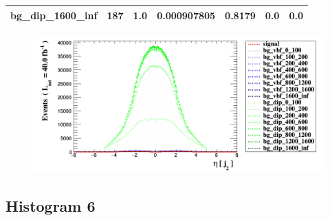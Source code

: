 \documentclass[a4paper, 10pt]{article}
\begin{document}
\begin{table}[H]
\begin{center}
\begin{tabular}{|m{23.0mm}|m{23.0mm}|m{18.0mm}|m{19.0mm}|m{19.0mm}|m{19.0mm}|m{19.0mm}|}
      \hline
      {\cellcolor{white}         bg\_dip\_1600\_inf}& {\cellcolor{white}         187}& {\cellcolor{white}         1.0}& {\cellcolor{white}         0.000907805}& {\cellcolor{white}         0.8179}& {\cellcolor{green}         0.0}& {\cellcolor{green}         0.0}\\
\hline
    \end{tabular}
  \end{center}
\end{table}

\begin{figure}[H]
  \begin{center}
    \includegraphics[scale=0.45]{selection_4.png}\\
\caption{   }
  \end{center}
\end{figure}
      \newpage
\subsection{ Histogram 6}
\end{document}
